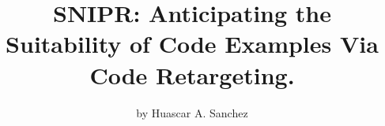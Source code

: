\documentclass[fontsize=8pt]{memoir} %
\begin{document}
\title{\uppercase{SnipR}: Anticipating the Suitability of Code Examples Via Code Retargeting.}
\author{by Huascar A. Sanchez}

\date{}
\maketitle




\todos


\end{document}
